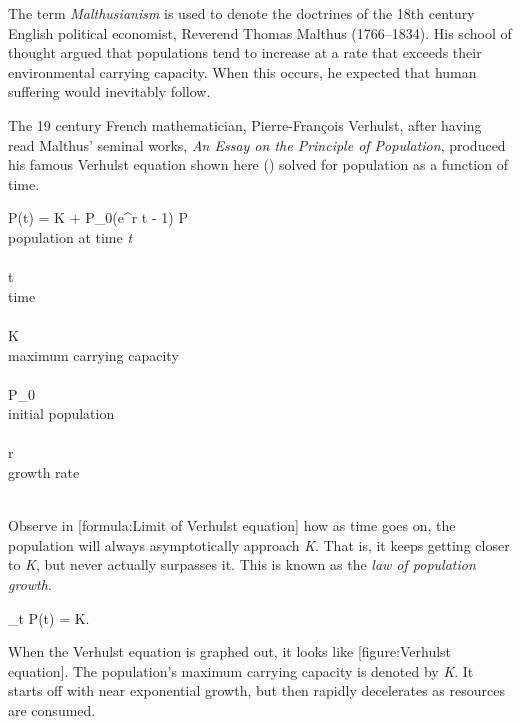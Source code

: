 The term {\it Malthusianism} is used to denote the doctrines of the 18th century English political economist, Reverend Thomas Malthus (1766--1834). His school of thought argued that populations tend to increase at a rate that exceeds their environmental carrying capacity. When this occurs, he expected that human suffering would inevitably follow.\footnotecite[malthus1798]

The 19 century French mathematician, Pierre-François Verhulst, after having read Malthus' seminal works, {\it An Essay on the Principle of Population}, produced his famous Verhulst equation shown here () solved for population as a function of time.
\crlf

\startformula
P(t) = 
             {K + P_0(e^{r t} - 1)}
\stopformula
\startlegend
\leg P \\ population at time {\it t} \\ \\
\leg t \\ time \\ \\
\leg K \\ maximum carrying capacity \\ \\
\leg P_0 \\ initial population \\ \\
\leg r \\ growth rate \\ \\
\stoplegend
\crlf

Observe in [formula:Limit of Verhulst equation] how as time goes on, the population will always asymptotically approach {\it K}. That is, it keeps getting closer to {\it K}, but never actually surpasses it. This is known as the {\it law of population growth}. 
\crlf

\startformula
\lim_{t\to\infty} P(t) = K.
\stopformula
\crlf

When the Verhulst equation is graphed out, it looks like [figure:Verhulst equation]. The population's maximum carrying capacity is denoted by {\it K}. It starts off with near exponential growth, but then rapidly decelerates as resources are consumed.

    {}

